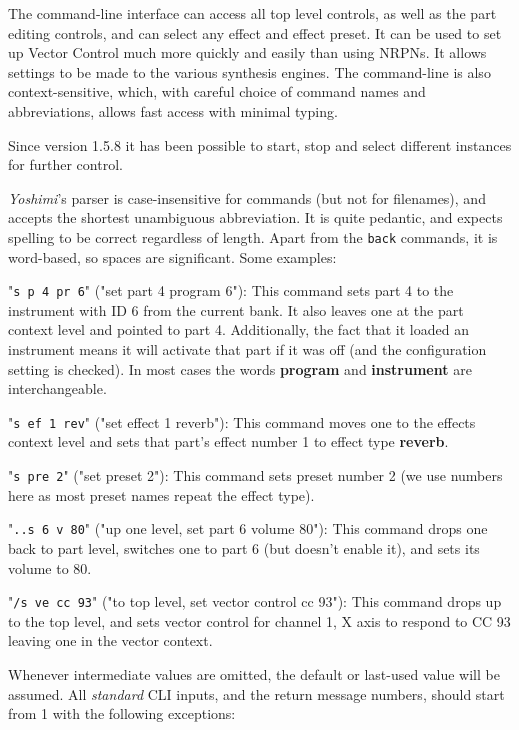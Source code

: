 \documentclass[
 11pt,
 twoside,
 a4paper,
 final                                 %
]{article}
\begin{document}
   The command-line interface can access all top level controls, as well as the
   part editing controls, and can select any effect and effect preset.  It can be
   used to set up Vector Control much more quickly and easily than using NRPNs.
   It allows settings to be made to the various synthesis engines.
   The command-line is also context-sensitive, which, with careful choice
   of command names and abbreviations, allows fast access with minimal
   typing.

   Since version 1.5.8 it has been possible to start, stop and select
   different instances for further control.

   \textsl{Yoshimi}'s parser is case-insensitive for commands (but not for
   filenames), and accepts the shortest unambiguous abbreviation. It is
   quite pedantic, and expects spelling to be correct regardless of length.
   Apart from the \texttt{back} commands, it is word-based, so spaces are
   significant.  Some examples:

   "\texttt{s p 4 pr 6}" ("set part 4 program 6"):
   This command sets part 4 to the instrument with ID 6 from the current bank.
   It also leaves one at the part context level and pointed to part 4.
   Additionally, the fact that it loaded an instrument means it will activate
   that part if it was off (and the configuration setting is checked). In most
   cases the words \textbf{program} and \textbf{instrument} are interchangeable.

   "\texttt{s ef 1 rev}" ("set effect 1 reverb"):
   This command moves one to the effects context level and sets that part's
   effect number 1 to effect type \textbf{reverb}.

   "\texttt{s pre 2}" ("set preset 2"):
   This command sets preset number 2 (we use numbers here as most preset names
   repeat the effect type).

   "\texttt{..s 6 v 80}" ("up one level, set part 6 volume 80"):
   This command drops one back to part level, switches one to part 6 (but doesn't
   enable it), and sets its volume to 80.

   "\texttt{/s ve cc 93}" ("to top level, set vector control cc 93"):
   This command drops up to the top level, and sets vector control for
   channel 1, X axis to respond to CC 93 leaving one in the vector context.

   Whenever intermediate values are omitted, the default or last-used value
   will be assumed.
   All \textsl{standard} CLI inputs, and the return message numbers,
   should start from 1 with the following exceptions:
\end{document}
